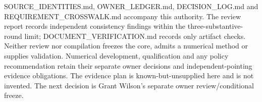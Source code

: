 {{SOURCE\_IDENTITIES.md, OWNER\_LEDGER.md, DECISION\_LOG.md and
REQUIREMENT\_CROSSWALK.md accompany this authority. The review report records
independent consistency findings within the three-substantive-round limit;
DOCUMENT\_VERIFICATION.md records only artifact checks. Neither review nor
compilation freezes the core, admits a numerical method or supplies validation.
Numerical development, qualification and any policy recommendation retain their
separate owner decisions and independent-pointing evidence obligations.
The evidence plan is known-but-unsupplied here and is not invented.
The next decision is Grant Wilson's separate owner review/conditional freeze.
}}
